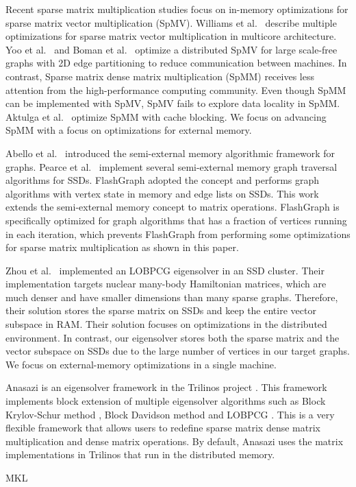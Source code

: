 Recent sparse matrix multiplication studies focus on in-memory optimizations
for sparse matrix vector multiplication (SpMV).
Williams et al.~\cite{Williams07} describe multiple optimizations for sparse matrix
vector multiplication in multicore architecture. Yoo et al.~\cite{Yoo11}
and Boman et al.~\cite{Boman2013} optimize a distributed SpMV for large
scale-free graphs with 2D edge partitioning to reduce communication between
machines. In contrast, Sparse matrix dense matrix multiplication (SpMM) receives
less attention from the high-performance computing community. Even though
SpMM can be implemented with SpMV, SpMV fails to explore data locality in SpMM.
Aktulga et al.~\cite{Aktulga14} optimize SpMM with cache blocking. We focus on
advancing SpMM with a focus on optimizations for external memory.

Abello et al.~\cite{Abello98} introduced the semi-external memory algorithmic
framework for graphs.  Pearce et al.~\cite{Pearce10} implement several 
semi-external memory graph traversal algorithms for SSDs. FlashGraph
\cite{flashgraph} adopted the concept and performs graph algorithms with
vertex state in memory and edge lists on SSDs. This work extends the semi-external
memory concept to matrix operations. FlashGraph is specifically optimized for
graph algorithms that has a fraction of vertices running in each iteration,
which prevents FlashGraph from performing some optimizations for sparse
matrix multiplication as shown in this paper.

Zhou et al.~\cite{Zhou12} implemented an LOBPCG \cite{Arbenz05} eigensolver in
an SSD cluster. Their implementation targets nuclear many-body Hamiltonian
matrices, which are much denser and have smaller dimensions than many sparse
graphs. Therefore, their solution stores the sparse matrix on SSDs and keep
the entire vector subspace in RAM. Their solution focuses on optimizations
in the distributed environment. In contrast, our eigensolver stores both
the sparse matrix and the vector subspace on SSDs due to the large number
of vertices in our target graphs. We focus on external-memory optimizations
in a single machine.

Anasazi \cite{anasazi} is an eigensolver framework in the Trilinos project
\cite{trilinos}. This framework implements block extension of multiple
eigensolver algorithms
such as Block Krylov-Schur method \cite{krylovschur}, Block Davidson method
\cite{Arbenz05} and LOBPCG \cite{Arbenz05}. This is a very flexible framework
that allows users to redefine sparse matrix dense matrix multiplication and
dense matrix operations. By default, Anasazi uses the matrix implementations
in Trilinos that run in the distributed memory.

MKL \cite{mkl}
